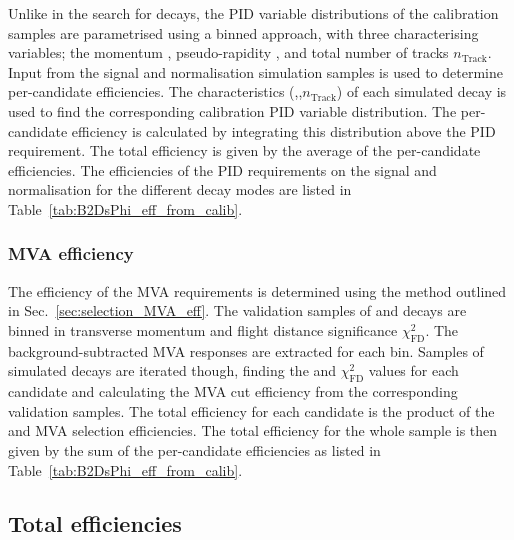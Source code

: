 Unlike in the search for \decay{\Bp}{\Dsp\Kp\Km} decays, the PID variable distributions of the calibration samples are parametrised using a binned approach, with three characterising variables; the momentum \ptot, pseudo-rapidity \Peta, and total number of tracks $n_{\text{Track}}$. Input from the signal and normalisation simulation samples is used to determine per-candidate efficiencies. The characteristics (\ptot,\Peta,$n_{\text{Track}}$) of each simulated decay is used to find the corresponding calibration PID variable distribution. The per-candidate efficiency is calculated by integrating this distribution above the PID requirement. The total efficiency is given by the average of the per-candidate efficiencies. The efficiencies of the PID requirements on the signal and normalisation for the different \Dsp decay modes are listed in Table~\ref{tab:B2DsPhi_eff_from_calib}.


\subsubsection{MVA efficiency}
\label{sec:B2DsPhi_eff_MVA}

The efficiency of the MVA requirements is determined using the method outlined in Sec.~\ref{sec:selection_MVA_eff}. The validation samples of \decay{\Bsb}{\Dsp\pim} and \decay{\Bs}{\jpsi\phiz} decays are binned in transverse momentum \pt and flight distance significance $\chi^{2}_{\text{FD}}$. The background-subtracted MVA responses are extracted for each bin. Samples of simulated decays are iterated though, finding the \pt and $\chi^{2}_{\text{FD}}$ values for each candidate and calculating the MVA cut efficiency from the corresponding validation samples. The total efficiency for each candidate is the product of the \Dsp and \phiz MVA selection efficiencies. The total efficiency for the whole sample is then given by the sum of the per-candidate efficiencies as listed in Table~\ref{tab:B2DsPhi_eff_from_calib}.




\subsection{Total efficiencies}

